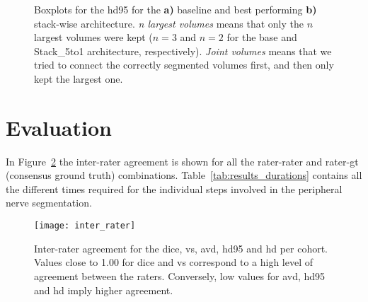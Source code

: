 \begin{figure}[htbp]
	\centering
	\hfill
	\caption[Post-processing impact on \acrlong{hd95}]{Boxplots for the \acrlong{hd95} for the \textbf{a)} baseline and best performing \textbf{b)} stack-wise architecture. \textit{n largest volumes} means that only the $n$ largest volumes were kept ($n = 3$ and $n = 2$ for the base and Stack\_5to1 architecture, respectively). \textit{Joint volumes} means that we tried to connect the correctly segmented volumes first, and then only kept the largest one.}
	\label{fig:pp_boxplots_hd95}  
\end{figure}





\section{Evaluation} \label{sec:exp_evaluation} %
In Figure~\ref{fig:res_inter_rater} the inter-rater agreement is shown for all the rater-rater and rater-gt (consensus ground truth) combinations. Table~\ref{tab:results_durations} contains all the different times required for the individual steps involved in the peripheral nerve segmentation.

\begin{figure}[htbp]	
	\texttt{[image: inter\_rater]}
    \caption[Inter-Rater Agreement]{Inter-rater agreement for the \acrlong{dice}, \acrlong{vs}, \acrlong{avd}, \acrlong{hd95} and \acrlong{hd} per cohort. Values close to 1.00 for \gls{dice} and \gls{vs} correspond to a high level of agreement between the raters. Conversely, low values for \gls{avd}, \gls{hd95} and \gls{hd} imply higher agreement.}
    \label{fig:res_inter_rater}
\end{figure}


